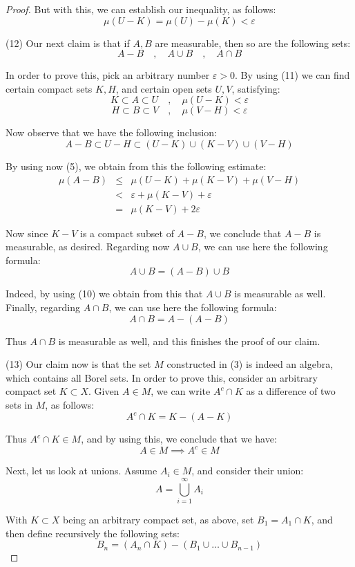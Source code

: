\documentclass[10pt,a4paper]{amsart}
\begin{document}
\begin{proof}
But with this, we can establish our inequality, as follows:
$$\mu(U-K)
=\mu(U)-\mu(K)<\varepsilon$$

(12) Our next claim is that if $A,B$ are measurable, then so are the following sets:
$$A-B\quad,\quad A\cup B\quad,\quad A\cap B$$

In order to prove this, pick an arbitrary number $\varepsilon>0$. By using (11) we can find certain compact sets $K,H$, and certain open sets $U,V$, satisfying:
$$K\subset A\subset U\quad,\quad \mu(U-K)<\varepsilon$$
$$H\subset B\subset V\quad,\quad \mu(V-H)<\varepsilon$$

Now observe that we have the following inclusion:
$$A-B
\subset U-H
\subset(U-K)\cup(K-V)\cup(V-H)$$

By using now (5), we obtain from this the following estimate:
\begin{eqnarray*}
\mu(A-B)
&\leq&\mu(U-K)+\mu(K-V)+\mu(V-H)\\
&<&\varepsilon+\mu(K-V)+\varepsilon\\
&=&\mu(K-V)+2\varepsilon
\end{eqnarray*}

Now since $K-V$ is a compact subset of $A-B$, we conclude that $A-B$ is measurable, as desired. Regarding now $A\cup B$, we can use here the following formula:
$$A\cup B=(A-B)\cup B$$

Indeed, by using (10) we obtain from this that $A\cup B$ is measurable as well. Finally, regarding  $A\cap B$, we can use here the following formula:
$$A\cap B=A-(A-B)$$

Thus $A\cap B$ is measurable as well, and this finishes the proof of our claim.

\medskip

(13) Our claim now is that the set $M$ constructed in (3) is indeed an algebra, which contains all Borel sets. In order to prove this, consider an arbitrary compact set $K\subset X$. Given $A\in M$, we can write $A^c\cap K$ as a difference of two sets in $M$, as follows:
$$A^c\cap K=K-(A-K)$$

Thus $A^c\cap K\in M$, and by using this, we conclude that we have:
$$A\in M\implies A^c\in M$$

Next, let us look at unions. Assume $A_i\in M$, and consider their union:
$$A=\bigcup_{i=1}^\infty A_i$$

With $K\subset X$ being an arbitrary compact set, as above, set $B_1=A_1\cap K$, and then define recursively the following sets:
$$B_n=(A_n\cap K)-(B_1\cup\ldots\cup B_{n-1})$$


\end{proof}
\end{document}
